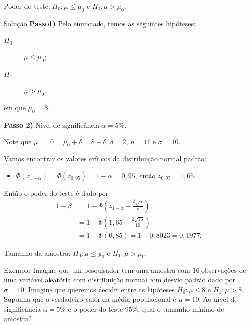 \documentclass[8pt]{beamer}
\begin{document}
\begin{frame}{Poder do teste: $H_0:\mu \leq \mu_0$ e $H_1: \mu > \mu_0$.}


\begin{block}{Solução}
	\textbf{Passo1)} Pelo enunciado, temos as seguintes hipóteses:
	\begin{description}
		\item[$H_0$] $\mu \leq \mu_0$;
		\item[$H_1$] $\mu > \mu_0$.
	\end{description}
	em que $\mu_0=8$.
	
	\textbf{Passo 2)} Nivel de significância $\alpha=5\%$.
	
	Note que $\mu = 10 =  \mu_0 + \delta = 8+\delta$, $\delta=2$, $n=16$ e $\sigma=10$.
	
	Vamos encontrar os valores críticos da distribuição normal padrão:
	\begin{itemize}
		\item $\Phi\left( z_{1-\alpha} \right) = \Phi\left( z_{0,95} \right) = 1-\alpha =0,95$, então $z_{0,95}=1,65$.
	\end{itemize}
	
	Então o poder do teste é dado por
	\begin{align*}
	1 - \beta &= 1 - \Phi \left( z_{1-\alpha} - \frac{\delta \sqrt{n}}{\sigma} \right)\\
	&= 1 - \Phi \left( 1,65 - \frac{2 \sqrt{16}}{10} \right)\\
	&= 1- \Phi\left(0,85 \right) = 1- 0,8023 = 0,1977.
	\end{align*}
\end{block}

\normalsize

\end{frame}


\begin{frame}{Tamanho da amostra: $H_0:\mu \leq \mu_0$ e $H_1: \mu > \mu_0$.}

\large

\begin{block}{Exemplo}
	Imagine que um pesquisador tem uma amostra com $16$ observações de uma variável aleatória com distribuição normal com desvio padrão dado por $\sigma=10$. Imagine que queremos decidir entre as hipóteses $H_0: \mu \leq 8$ e $H_1: \mu > 8$. Suponha que o verdadeiro valor da média populacional é $\mu = 10$. Ao nível de significância $\alpha=5\%$ e o poder do teste $95\%$, qual o tamanho \sout{mínimo} de amostra?
\end{block}


\normalsize
\end{frame}
\end{document}
